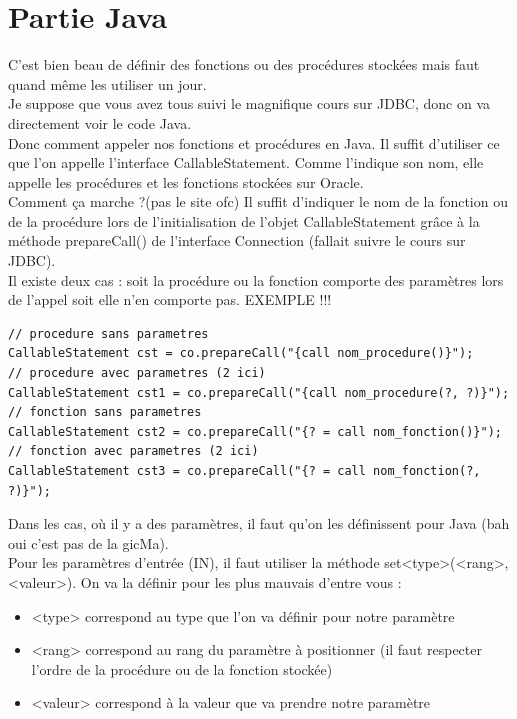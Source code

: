 \documentclass{report}
\begin{document}
\section{Partie Java}
C'est bien beau de définir des fonctions ou des procédures stockées mais faut quand même les utiliser un jour.\\
Je suppose que vous avez tous suivi le magnifique cours sur JDBC, donc on va directement voir le code Java.\\
Donc comment appeler nos fonctions et procédures en Java. Il suffit d'utiliser ce que l'on appelle l'interface CallableStatement. Comme l'indique son nom, elle appelle les procédures et les fonctions stockées sur Oracle.\\
Comment ça marche ?(pas le site ofc)
Il suffit d'indiquer le nom de la fonction ou de la procédure lors de l'initialisation de l'objet CallableStatement grâce à la méthode prepareCall() de l'interface Connection (fallait suivre le cours sur JDBC).\\
Il existe deux cas : soit la procédure ou la fonction comporte des paramètres lors de l'appel soit elle n'en comporte pas. EXEMPLE !!!

\begin{lstlisting}[style=MyJavaStyle]
// procedure sans parametres
CallableStatement cst = co.prepareCall("{call nom_procedure()}");
// procedure avec parametres (2 ici)
CallableStatement cst1 = co.prepareCall("{call nom_procedure(?, ?)}");
// fonction sans parametres
CallableStatement cst2 = co.prepareCall("{? = call nom_fonction()}");
// fonction avec parametres (2 ici)
CallableStatement cst3 = co.prepareCall("{? = call nom_fonction(?, ?)}");
\end{lstlisting}
Dans les cas, où il y a des paramètres, il faut qu'on les définissent pour Java (bah oui c'est pas de la gicMa).\\
Pour les paramètres d'entrée (IN), il faut utiliser la méthode set<type>(<rang>, <valeur>).
On va la définir pour les plus mauvais d'entre vous :
\begin{itemize}
\item <type> correspond au type que l'on va définir pour notre paramètre
\item <rang> correspond au rang du paramètre à positionner (il faut respecter l'ordre de la procédure ou de la fonction stockée)
\item <valeur> correspond à la valeur que va prendre notre paramètre
\end{itemize}
\end{document}
